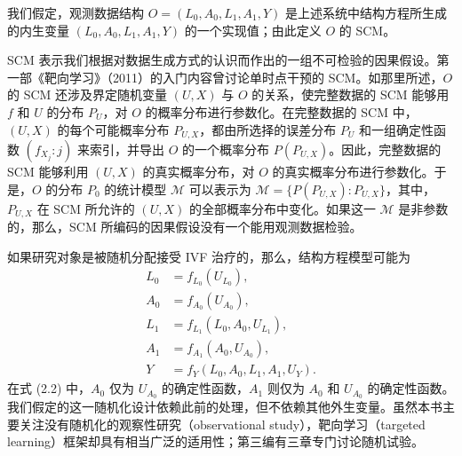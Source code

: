 我们假定，观测数据结构 $O=(L_0,A_0,L_1,A_1,Y)$ 是上述系统中结构方程所生成的内生变量 $(L_0,A_0,L_1,A_1,Y)$ 的一个实现值；由此定义 $O$ 的 SCM。

SCM 表示我们根据对数据生成方式的认识而作出的一组不可检验的因果假设。第一部《靶向学习》（2011）的入门内容曾讨论单时点干预的 SCM。如那里所述，$O$ 的 SCM 还涉及界定随机变量 $(U,X)$ 与 $O$ 的关系，使完整数据的 SCM 能够用 $f$ 和 $U$ 的分布 $P_U$，对 $O$ 的概率分布进行参数化。在完整数据的 SCM 中，$(U,X)$ 的每个可能概率分布 $P_{U,X}$，都由所选择的误差分布 $P_U$ 和一组确定性函数 $(f_{X_j}:j)$ 来索引，并导出 $O$ 的一个概率分布 $P(P_{U,X})$。因此，完整数据的 SCM 能够利用 $(U,X)$ 的真实概率分布，对 $O$ 的真实概率分布进行参数化。于是，$O$ 的分布 $P_0$ 的统计模型 $\mathcal M$ 可以表示为 $\mathcal M=\{P(P_{U,X}):P_{U,X}\}$，其中，$P_{U,X}$ 在 SCM 所允许的 $(U,X)$ 的全部概率分布中变化。如果这一 $\mathcal M$ 是非参数的，那么，SCM 所编码的因果假设没有一个能用观测数据检验。

如果研究对象是被随机分配接受 IVF 治疗的，那么，结构方程模型可能为
\begin{equation}
 \begin{aligned}
 L_0&=f_{L_0}(U_{L_0}),\\
 A_0&=f_{A_0}(U_{A_0}),\\
 L_1&=f_{L_1}(L_0,A_0,U_{L_1}),\\
 A_1&=f_{A_1}(A_0,U_{A_0}),\\
 Y&=f_Y(L_0,A_0,L_1,A_1,U_Y).
 \end{aligned}
 \tag{2.2}
\end{equation}
在式 (2.2) 中，$A_0$ 仅为 $U_{A_0}$ 的确定性函数，$A_1$ 则仅为 $A_0$ 和 $U_{A_0}$ 的确定性函数。我们假定的这一随机化设计依赖此前的处理，但不依赖其他外生变量。虽然本书主要关注没有随机化的观察性研究（observational study），靶向学习（targeted learning）框架却具有相当广泛的适用性；第三编有三章专门讨论随机试验。
